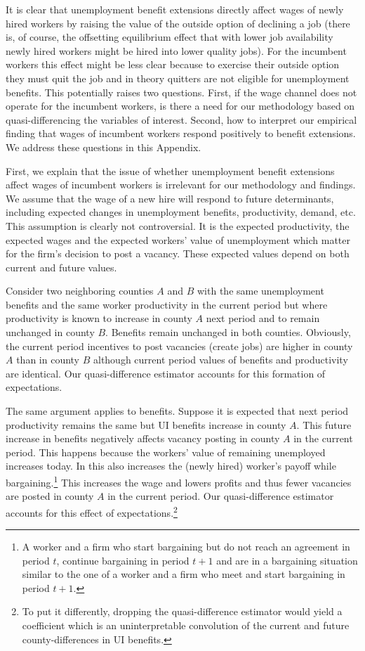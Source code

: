 \documentclass[12pt]{article}
\newcommand{\1}{\mathbf{1}}
\begin{document}
\begin{appendix}
It is clear that unemployment benefit extensions directly affect wages of newly hired workers by raising the value of the outside option of declining a job (there is, of course, the offsetting equilibrium effect that with lower job availability newly hired workers might be hired into lower quality jobs). For the incumbent workers this effect might be less clear because to exercise their outside option they must quit the job and in theory quitters are not eligible for unemployment benefits. This potentially raises two questions. First, if the wage channel does not operate for the incumbent workers, is there a need for our methodology based on quasi-differencing the variables of interest. Second, how to interpret our empirical finding that wages of incumbent workers respond positively to benefit extensions. We address these questions in this Appendix.


First, we explain that the issue of whether unemployment benefit extensions affect wages of incumbent workers is irrelevant for our methodology and findings. We assume that the wage of a new hire will respond to future determinants, including expected changes in unemployment benefits, productivity, demand, etc. This assumption is clearly not controversial. It is the expected productivity, the expected wages and the expected workers' value of unemployment which matter for the firm's decision to post a vacancy. These expected values depend on both current and future values.

Consider two neighboring counties $A$ and $B$ with the same unemployment benefits and the same worker productivity in the current period but where productivity is known to increase in county $A$ next period and to remain unchanged in county $B$. Benefits remain unchanged in both counties. Obviously, the current period incentives to post vacancies (create jobs) are higher in county $A$ than in county $B$ although current period values of benefits and productivity are identical. Our quasi-difference estimator accounts for this formation of expectations.

The same argument applies to benefits. Suppose it is expected that next period productivity remains the same but UI benefits increase in county $A$. This future increase in benefits negatively affects vacancy posting in county $A$ in the current period. This happens because the workers' value of remaining unemployed increases today. In \citet{hall+milgrom:08} this also increases the (newly hired) worker's payoff while bargaining.\footnote{A worker and a firm who start bargaining but do not reach an agreement in period $t$, continue bargaining in period $t+1$ and are in a bargaining situation similar to the one of a worker and a firm who meet and start bargaining in period $t+1$.}
This increases the wage and lowers profits and thus fewer vacancies are posted in county $A$ in the current period. Our quasi-difference estimator accounts for this effect of expectations.\footnote{To put it differently, dropping the quasi-difference estimator would yield a coefficient which is an uninterpretable convolution of the current and future county-differences in UI benefits.}


\end{appendix}
\end{document}
